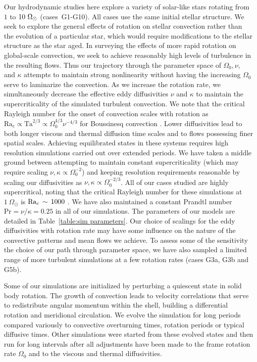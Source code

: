 Our hydrodynamic studies here explore a variety of solar-like stars
rotating from $1$ to $10~\Omega_\odot$ (cases~G1-G10).  All cases use
the same initial stellar structure.
%
We seek to explore the general effects of rotation on stellar
convection rather than the evolution of a particular star, which would
require modifications to the stellar structure as the star aged.  In
surveying the effects of more rapid rotation on global-scale
convection, we seek to achieve reasonably high levels of turbulence
in the resulting flows.  Thus our trajectory through the parameter
space of $\Omega_0, \nu,$ and $\kappa$ attempts to maintain strong
nonlinearity without having the increasing $\Omega_0$ serve to laminarize the
convection.
%
As we increase the rotation rate, we simultaneously decrease the
effective eddy diffusivities $\nu$ and $\kappa$ to maintain the
supercriticality of the simulated turbulent convection.  We note that
the critical Rayleigh number for the onset of convection scales with
rotation as $\mathrm{Ra}_c \propto \mathrm{Ta}^{2/3} \propto \Omega_0^{4/3}\nu^{-4/3}$ for Boussinesq
convection \citep[e.g.,][]{Chandrasekhar_1961, Dormy_et_al_2004}.
Lower diffusivities lead to both longer viscous and thermal diffusion
time scales and to flows possessing finer spatial scales.  Achieving
equilibrated states in these systems requires high resolution
simulations carried out over extended periods.  We have taken a middle
ground between attempting to maintain constant supercriticality (which
may require scaling $\nu, \kappa \propto \Omega_0^{-2}$) and keeping
resolution requirements reasonable by scaling our diffusivities as
$\nu, \kappa \propto \Omega_0^{-2/3}$.  All of our cases studied
are highly supercritical, noting that the critical Rayleigh
number for these simulations at $1~\Omega_\odot$ is $\mathrm{Ra}_c
\thinspace \sim \thinspace 1000$ \citep{Gilman&Glatzmaier_1981,
Miesch_thesis}.  We have also maintained a constant Prandtl number
$\mathrm{Pr} = \nu / \kappa = 0.25$ in all of our simulations.  The
parameters of our models are detailed in Table~\ref{table:sim
parameters}.  Our choice of scalings for the eddy diffusivities with
rotation rate may have some influence on the nature of the convective
patterns and mean flows we achieve. To assess some of the sensitivity
the choice of our path through parameter space, we have also sampled a
limited range of more turbulent simulations at a few rotation rates
(cases G3a, G3b and G5b).

Some of our simulations are initialized by perturbing a quiescent
state in solid body rotation.  The growth of convection leads to
velocity correlations that serve to redistribute angular momentum
within the shell, building a differential rotation and meridional
circulation.  We evolve the simulation for long periods compared
variously to convective overturning times, rotation periods or typical
diffusive times.  Other simulations were started from these evolved
states and then run for long intervals after all adjustments have been
made to the frame rotation rate $\Omega_0$ and to the viscous and
thermal diffusivities.  


